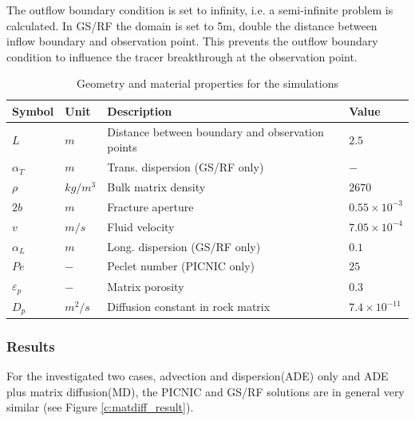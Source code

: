 The outflow boundary condition is set to infinity, i.e. a
semi-infinite problem is calculated. In GS/RF the domain is set to
5m, double the distance between inflow boundary and observation
point. This prevents the outflow boundary condition to influence the
tracer breakthrough at the observation point.

\begin{table}[H]
  \begin{center}
  \begin{tabular}{llll}
\hline\noalign{\smallskip}
  \hline
 Symbol & Unit & Description & Value \\
  \hline
 $L$ & $m$ & Distance between boundary and observation points & $2.5$ \\
 $\alpha_{T}$ & $m$ & Trans. dispersion (GS/RF only) & $-$ \\
 $\rho$ & $kg/m^{3}$ & Bulk matrix density & $2670$ \\
 $2b$ & $m$ & Fracture aperture & $0.55\times10^{-3}$ \\
 $v$ & $m/s$ & Fluid velocity & $7.05\times10^{-4}$ \\
 $\alpha_{L}$ & $m$ & Long. dispersion (GS/RF only) & $0.1$ \\
 $Pe$ & $-$ & Peclet number (PICNIC only) & $25$ \\
 $\varepsilon_{p}$ & $-$ & Matrix porosity & $0.3$ \\
 $D_{p}$ & $m^{2}/s$ & Diffusion constant in rock matrix & $7.4\times10^{-11}$ \\
  \hline
  \hline
  \end{tabular}
  \caption{Geometry and material properties for the simulations} %
  \label{tab:c_matdiff_setting}
  \end{center}
\end{table}

\subsubsection*{Results}
For the investigated two cases, advection and dispersion(ADE) only
and ADE plus matrix diffusion(MD), the PICNIC and GS/RF solutions
are in general very similar (see Figure \ref{c:matdiff_result}).

